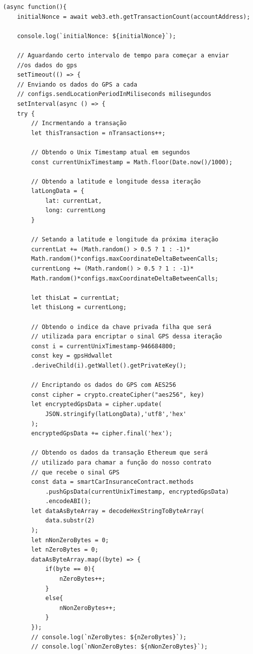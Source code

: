\begin{code}
\begin{verbatim}
(async function(){
    initialNonce = await web3.eth.getTransactionCount(accountAddress);

    console.log(`initialNonce: ${initialNonce}`);

    // Aguardando certo intervalo de tempo para começar a enviar 
    //os dados do gps
    setTimeout(() => {
    // Enviando os dados do GPS a cada 
    // configs.sendLocationPeriodInMiliseconds milisegundos
    setInterval(async () => {
    try {
        // Incrmentando a transação
        let thisTransaction = nTransactions++;

        // Obtendo o Unix Timestamp atual em segundos
        const currentUnixTimestamp = Math.floor(Date.now()/1000);

        // Obtendo a latitude e longitude dessa iteração
        latLongData = {
            lat: currentLat,
            long: currentLong
        }

        // Setando a latitude e longitude da próxima iteração
        currentLat += (Math.random() > 0.5 ? 1 : -1)*
        Math.random()*configs.maxCoordinateDeltaBetweenCalls;
        currentLong += (Math.random() > 0.5 ? 1 : -1)*
        Math.random()*configs.maxCoordinateDeltaBetweenCalls;

        let thisLat = currentLat;
        let thisLong = currentLong;

        // Obtendo o indice da chave privada filha que será 
        // utilizada para encriptar o sinal GPS dessa iteração
        const i = currentUnixTimestamp-946684800;
        const key = gpsHdwallet
        .deriveChild(i).getWallet().getPrivateKey();

        // Encriptando os dados do GPS com AES256
        const cipher = crypto.createCipher("aes256", key)
        let encryptedGpsData = cipher.update(
            JSON.stringify(latLongData),'utf8','hex'
        );
        encryptedGpsData += cipher.final('hex');

        // Obtendo os dados da transação Ethereum que será 
        // utilizado para chamar a função do nosso contrato 
        // que recebe o sinal GPS
        const data = smartCarInsuranceContract.methods
            .pushGpsData(currentUnixTimestamp, encryptedGpsData)
            .encodeABI();
        let dataAsByteArray = decodeHexStringToByteArray(
            data.substr(2)
        );
        let nNonZeroBytes = 0;
        let nZeroBytes = 0;
        dataAsByteArray.map((byte) => {
            if(byte == 0){
                nZeroBytes++;
            }
            else{
                nNonZeroBytes++;
            }
        });
        // console.log(`nZeroBytes: ${nZeroBytes}`);
        // console.log(`nNonZeroBytes: ${nNonZeroBytes}`);


\end{verbatim}
\end{code}

